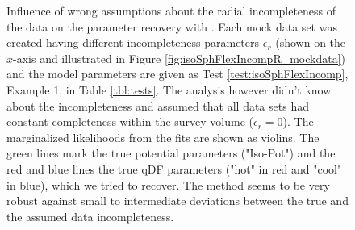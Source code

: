 \addtocounter{figure}{-1}
\begin{figure} [t!]
\caption{Influence of wrong assumptions about the radial incompleteness of the data on the parameter recovery with \RM. Each mock data set was created having different incompleteness parameters $\epsilon_r$ (shown on the $x$-axis and illustrated in Figure \ref{fig:isoSphFlexIncompR_mockdata}) and the model parameters are given as Test \ref{test:isoSphFlexIncomp}, Example 1, in Table \ref{tbl:tests}. The analysis however didn't know about the incompleteness and assumed that all data sets had constant completeness within the survey volume ($\epsilon_r = 0$). The marginalized likelihoods from the fits are shown as violins. The green lines mark the true potential parameters ("Iso-Pot") and the red and blue lines the true qDF parameters ("hot" \MAP in red and "cool" \MAP in blue), which we tried to recover. The \RM method seems to be very robust against small to intermediate deviations between the true and the assumed data incompleteness.} 
\label{fig:isoSphFlexIncompR_violins}
\end{figure}

